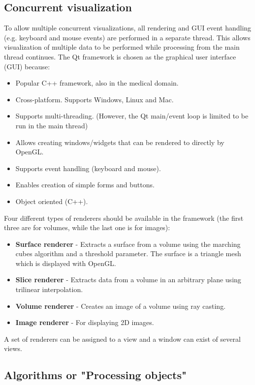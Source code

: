 \documentclass{article}
\begin{document}
\subsection{Concurrent visualization}

To allow multiple concurrent visualizations, all rendering and GUI event handling (e.g. keyboard and mouse events) are performed in a separate thread.
This allows visualization of multiple data to be performed while processing from the main thread continues.
The Qt framework is chosen as the graphical user interface (GUI) because:

\begin{itemize}
    \itemsep 1pt
    \item Popular C++ framework, also in the medical domain.
    \item Cross-platform. Supports Windows, Linux and Mac.
    \item Supports multi-threading. (However, the Qt main/event loop is limited to be run in the main thread)
    \item Allows creating windows/widgets that can be rendered to directly by OpenGL.
    \item Supports event handling (keyboard and mouse).
    \item Enables creation of simple forms and buttons.
    \item Object oriented (C++).
\end{itemize}

Four different types of renderers should be available in the framework (the first three are for volumes, while the last one is for images):
\begin{itemize}
    \itemsep 1pt
    \item \textbf{Surface renderer} - Extracts a surface from a volume using the marching cubes algorithm and a threshold parameter. The surface is a triangle mesh which is displayed with OpenGL.
    \item \textbf{Slice renderer} - Extracts data from a volume in an arbitrary plane using trilinear interpolation.
    \item \textbf{Volume renderer} - Creates an image of a volume using ray casting.
    \item \textbf{Image renderer} - For displaying 2D images.
\end{itemize}

A set of renderers can be assigned to a view and a window can exist of several views.

\subsection{Algorithms or "Processing objects"}
\end{document}
